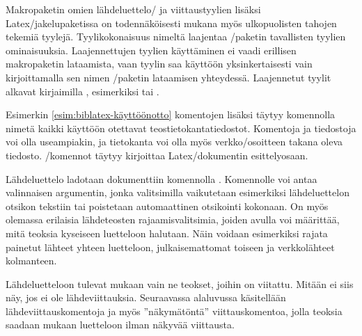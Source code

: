 Makropaketin omien lähdeluettelo\-/{} ja viittaustyylien lisäksi
Latex\-/jakelupaketissa on todennäköisesti mukana myös ulkopuolisten
tahojen tekemiä tyylejä. Tyylikokonaisuus nimeltä
 laajentaa
\-/paketin tavallisten tyylien ominaisuuksia.
Laajennettujen tyylien käyttäminen ei vaadi erillisen makropaketin
lataamista, vaan tyylin saa käyttöön yksinkertaisesti vain
kirjoittamalla sen nimen \-/paketin lataamisen
yhteydessä. Laajennetut tyylit alkavat kirjaimilla \mbox{,}
esimerkiksi  tai .

Esimerkin \ref{esim:biblatex-käyttöönotto} komentojen lisäksi täytyy
komennolla  nimetä kaikki käyttöön
otettavat teostietokantatiedostot. Komentoja ja tiedostoja voi olla
useampiakin, ja tietokanta voi olla myös verkko\-/osoitteen takana oleva
tiedosto. \-/komennot täytyy
kirjoittaa Latex\-/dokumentin esittelyosaan.

\begin{koodilohkosis}
  
  
  
\end{koodilohkosis}

Lähdeluettelo ladotaan dokumenttiin komennolla . Komennolle voi antaa valinnaisen
argumentin, jonka valitsimilla vaikutetaan esimerkiksi lähdeluettelon
otsikon tekstiin tai poistetaan automaattinen otsikointi kokonaan. On
myös olemassa erilaisia lähdeteosten rajaamisvalitsimia, joiden avulla
voi määrittää, mitä teoksia kyseiseen luetteloon halutaan. Näin voidaan
esimerkiksi rajata painetut lähteet yhteen luetteloon, julkaisemattomat
toiseen ja verkkolähteet kolmanteen.

\begin{koodilohkosis}
  \printbibliography
  \printbibliography[title={Lähteet}]
  \printbibliography[heading=none,  %
    type=online]           %
\end{koodilohkosis}

Lähdeluetteloon tulevat mukaan vain ne teokset, joihin on viitattu.
Mitään ei siis näy, jos ei ole lähdeviittauksia. Seuraavassa alaluvussa
käsitellään lähdeviittauskomentoja ja myös ''näkymätöntä''
viittauskomentoa, jolla teoksia saadaan mukaan luetteloon ilman näkyvää
viittausta.


